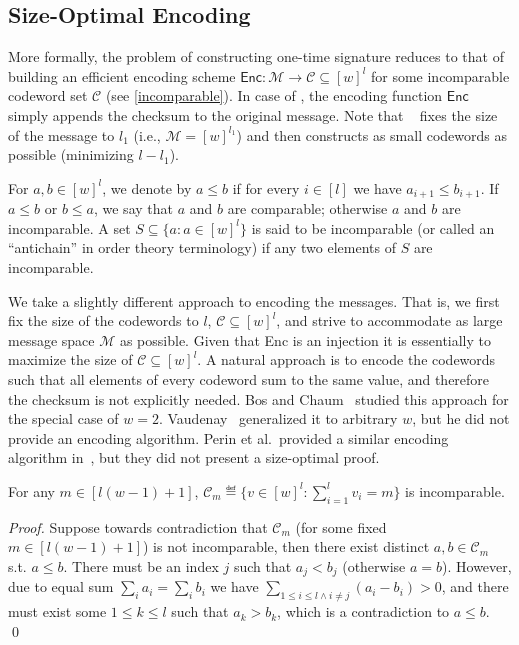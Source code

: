 \subsection{Size-Optimal Encoding}

More formally, the problem of constructing one-time signature reduces to that of building an efficient encoding scheme $\mathsf{Enc}:\mathcal{M}\rightarrow \mathcal{C}\subseteq[w]^{l}$ for some incomparable codeword set $\mathcal{C}$ (see \cref{incomparable}). In case of \WOTSP, the encoding function $\mathsf{Enc}$ simply appends the checksum to the original message. Note that \WOTSP~ fixes the size of the message to $l_1$ (i.e., $\mathcal{M}=[w]^{l_1}$) and then constructs as small codewords as possible (minimizing $l-l_1$).





\begin{definition}[(In)comparability]\label{incomparable}
For $a,b\in[w]^l$, we denote by $a \leq b$ if for every $i \in [l]$ we have
$a_{i+1}\leq b_{i+1}$.  If $a\leq b$ or $b\leq a$, we say that $a$ and $b$ are
comparable; otherwise $a$ and $b$ are incomparable.
A set $S\subseteq\{a:a\in[w]^l\}$ is said to be incomparable (or called an ``antichain'' in order theory terminology) if any two elements of $S$ are incomparable. 
\end{definition}

We take a slightly different approach to encoding the messages. That is, we first fix the size of the codewords to $l$, $\mathcal{C}\subseteq[w]^{l}$, and strive to accommodate as large message space $\mathcal{M}$ as possible. Given that {\sf Enc} is an injection it is essentially to maximize the size of $\mathcal{C}\subseteq[w]^{l}$. A natural approach is to encode the codewords such that 
all elements of every codeword sum to the same value, and therefore the checksum is not explicitly needed.
Bos and Chaum~\cite{C:BosCha92} studied this approach for the special case of $w=2$.  Vaudenay~\cite{vaudenay1993one} generalized it to arbitrary $w$, but he did not provide an encoding algorithm. Perin et al.\ provided a similar encoding algorithm in~\cite{perin2021improved}, but they did not present a size-optimal proof.
 
 
\begin{theorem}
    \label{Eisantichain}
    For any $m\in[l(w-1)+1]$, 
   $\mathcal{C}_m\eqdef\{v\in [w]^l : \sum_{i=1}^l v_i = m \}$ is incomparable.
\end{theorem}
\begin{proof}
Suppose towards contradiction that $\mathcal{C}_m$ (for some fixed $m\in[l(w-1)+1]$) is not incomparable, then there exist distinct $a,b\in \mathcal{C}_m$ s.t. $a\leq b$. There must be an index $j$ such that $a_j<b_j$ (otherwise $a= b$). However, due to equal sum  $\sum_i a_i=\sum_i b_i$  we have $\sum_{1\leq i\leq l \wedge i\neq j} (a_i-b_i)>0$, and there must exist some $1\leq k\leq l$ such that $a_k>b_k$, which is a contradiction to $a\leq b$. \qed
\end{proof}

